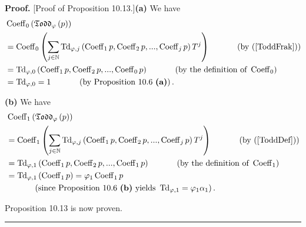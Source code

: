\documentclass[numbers=enddot,12pt,final,onecolumn,notitlepage]{scrartcl}%
\newenvironment{proof}[1][Proof]{\noindent\textbf{#1.} }{\ \rule{0.5em}{0.5em}}
\begin{document}
\begin{proof}
[Proof of Proposition 10.13.]\textbf{(a)} We have%
\begin{align*}
&  \operatorname*{Coeff}\nolimits_{0}\left(  \mathfrak{Todd}_{\varphi}\left(
p\right)  \right) \\
&  =\operatorname*{Coeff}\nolimits_{0}\left(  \sum_{j\in\mathbb{N}%
}\operatorname*{Td}\nolimits_{\varphi,j}\left(  \operatorname*{Coeff}%
\nolimits_{1}p,\operatorname*{Coeff}\nolimits_{2}p,...,\operatorname*{Coeff}%
\nolimits_{j}p\right)  T^{j}\right)  \ \ \ \ \ \ \ \ \ \ \left(  \text{by
(\ref{ToddFrak})}\right) \\
&  =\operatorname*{Td}\nolimits_{\varphi,0}\left(  \operatorname*{Coeff}%
\nolimits_{1}p,\operatorname*{Coeff}\nolimits_{2}p,...,\operatorname*{Coeff}%
\nolimits_{0}p\right)  \ \ \ \ \ \ \ \ \ \ \left(  \text{by the definition of
}\operatorname*{Coeff}\nolimits_{0}\right) \\
&  =\operatorname*{Td}\nolimits_{\varphi,0}=1\ \ \ \ \ \ \ \ \ \ \left(
\text{by Proposition 10.6 \textbf{(a)}}\right)  .
\end{align*}


\textbf{(b)} We have%
\begin{align*}
&  \operatorname*{Coeff}\nolimits_{1}\left(  \mathfrak{Todd}_{\varphi}\left(
p\right)  \right) \\
&  =\operatorname*{Coeff}\nolimits_{1}\left(  \sum_{j\in\mathbb{N}%
}\operatorname*{Td}\nolimits_{\varphi,j}\left(  \operatorname*{Coeff}%
\nolimits_{1}p,\operatorname*{Coeff}\nolimits_{2}p,...,\operatorname*{Coeff}%
\nolimits_{j}p\right)  T^{j}\right)  \ \ \ \ \ \ \ \ \ \ \left(  \text{by
(\ref{ToddDef})}\right) \\
&  =\operatorname*{Td}\nolimits_{\varphi,1}\left(  \operatorname*{Coeff}%
\nolimits_{1}p,\operatorname*{Coeff}\nolimits_{2}p,...,\operatorname*{Coeff}%
\nolimits_{1}p\right)  \ \ \ \ \ \ \ \ \ \ \left(  \text{by the definition of
}\operatorname*{Coeff}\nolimits_{1}\right) \\
&  =\operatorname*{Td}\nolimits_{\varphi,1}\left(  \operatorname*{Coeff}%
\nolimits_{1}p\right)  =\varphi_{1}\operatorname*{Coeff}\nolimits_{1}p\\
&  \ \ \ \ \ \ \ \ \ \ \left(  \text{since Proposition 10.6 \textbf{(b)}
yields }\operatorname*{Td}\nolimits_{\varphi,1}=\varphi_{1}\alpha_{1}\right)
.
\end{align*}


Proposition 10.13 is now proven.
\end{proof}
\end{document}
